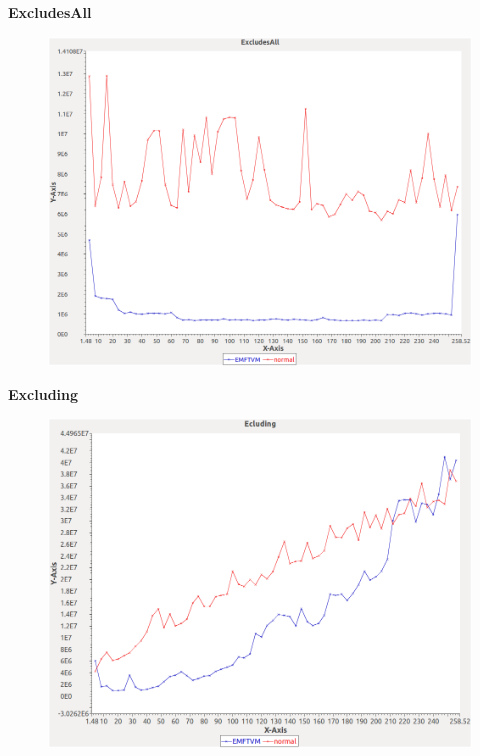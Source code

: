 \noindent\textbf{ExcludesAll}

\begin{figure}[h]
\centering
\includegraphics[width=\textwidth]{../graphs/bag/ExcludesAll}
\end{figure}
\pagebreak

\noindent\textbf{Excluding}

\begin{figure}[h]
\centering
\includegraphics[width=\textwidth]{../graphs/bag/Excluding}
\end{figure}
\pagebreak

